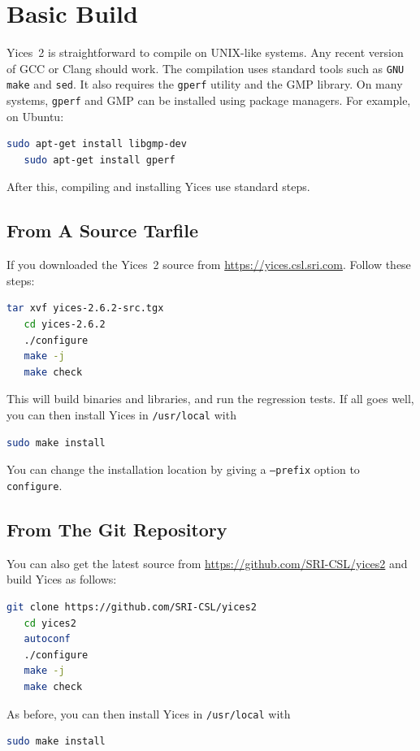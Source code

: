 \documentclass[11pt,twoside,fleqn,openright,titlepage]{cslreport}
\begin{document}
\section{Basic Build}

Yices~2 is straightforward to compile on UNIX-like systems. Any recent
version of GCC or Clang should work. The compilation uses standard
tools such as \texttt{GNU make} and \texttt{sed}. It also requires the
\texttt{gperf} utility and the GMP library. On many systems,
\texttt{gperf} and GMP can be installed using package
managers.  For example, on Ubuntu:
\begin{small}
\begin{lstlisting}[language=sh]
   sudo apt-get install libgmp-dev
   sudo apt-get install gperf
\end{lstlisting}
\end{small}
After this, compiling and installing Yices use standard steps.

\subsection*{From A Source Tarfile}

If you downloaded the Yices~2 source from \url{https://yices.csl.sri.com}. Follow these steps:
\begin{small}
\begin{lstlisting}[language=sh,deletekeywords={cd}]
   tar xvf yices-2.6.2-src.tgx
   cd yices-2.6.2
   ./configure
   make -j
   make check
\end{lstlisting}
\end{small}
This will build binaries and libraries, and run the regression tests. If all goes well, you can then
install Yices in \texttt{/usr/local} with
\begin{small}
\begin{lstlisting}[language=sh]
   sudo make install
\end{lstlisting}
\end{small}
You can change the installation location by giving a \texttt{--prefix} option
to \texttt{configure}.

\subsection*{From The Git Repository}

You can also get the latest source from \url{https://github.com/SRI-CSL/yices2} and build Yices as follows:
\begin{small}
\begin{lstlisting}[language=sh,deletekeywords={cd}]
   git clone https://github.com/SRI-CSL/yices2
   cd yices2
   autoconf
   ./configure
   make -j
   make check
\end{lstlisting}
\end{small}
As before, you can then install Yices in \texttt{/usr/local} with
\begin{small}
\begin{lstlisting}[language=sh]
   sudo make install
\end{lstlisting}
\end{small}
\end{document}
